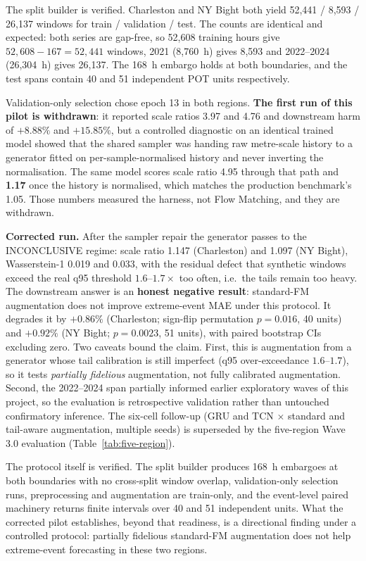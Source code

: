 The split builder is verified. Charleston and NY Bight both yield 52,441 /
8,593 / 26,137 windows for train / validation / test. The counts are identical
and expected: both series are gap-free, so 52,608 training hours give
$52{,}608-167=52{,}441$ windows, 2021 (8,760~h) gives 8,593 and 2022--2024
(26,304~h) gives 26,137. The 168~h embargo holds at both boundaries, and the
test spans contain 40 and 51 independent POT units respectively.

Validation-only selection chose epoch 13 in both regions. \textbf{The first run
of this pilot is withdrawn}: it reported scale ratios 3.97 and 4.76 and
downstream harm of $+8.88\%$ and $+15.85\%$, but a controlled diagnostic on an
identical trained model showed that the shared sampler was handing raw
metre-scale history to a generator fitted on per-sample-normalised history and
never inverting the normalisation. The same model scores scale ratio 4.95
through that path and \textbf{1.17} once the history is normalised, which
matches the production benchmark's 1.05. Those numbers measured the harness, not
Flow Matching, and they are withdrawn.

\textbf{Corrected run.} After the sampler repair the generator passes to the
INCONCLUSIVE regime: scale ratio 1.147 (Charleston) and 1.097 (NY Bight),
Wasserstein-1 0.019 and 0.033, with the residual defect that synthetic windows
exceed the real q95 threshold $1.6$--$1.7\times$ too often, i.e.\ the tails
remain too heavy. The downstream answer is an \textbf{honest negative result}:
standard-FM augmentation does not improve extreme-event MAE under this
protocol. It degrades it by $+0.86\%$ (Charleston; sign-flip permutation
$p=0.016$, 40 units) and $+0.92\%$ (NY Bight; $p=0.0023$, 51 units), with
paired bootstrap CIs excluding zero. Two caveats bound the claim. First, this
is augmentation from a generator whose tail calibration is still imperfect
(q95 over-exceedance $1.6$--$1.7$), so it tests \emph{partially fidelious}
augmentation, not fully calibrated augmentation. Second, the 2022--2024 span
partially informed earlier exploratory waves of this project, so the evaluation
is retrospective validation rather than untouched confirmatory inference. The
six-cell follow-up (GRU and TCN $\times$ standard and tail-aware augmentation,
multiple seeds) is superseded by the five-region Wave 3.0 evaluation
(Table~\ref{tab:five-region}).

The protocol itself is verified. The split builder produces 168~h embargoes at
both boundaries with no cross-split window overlap, validation-only selection
runs, preprocessing and augmentation are train-only, and the event-level
paired machinery returns finite intervals over 40 and 51 independent units.
What the corrected pilot establishes, beyond that readiness, is a directional
finding under a controlled protocol: partially fidelious standard-FM
augmentation does not help extreme-event forecasting in these two regions.

